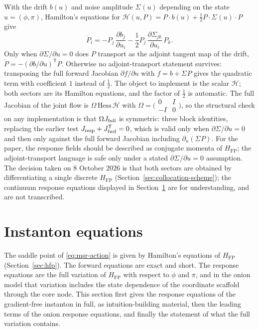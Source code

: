 \documentclass[a4paper,11pt]{article}
\newcommand{\semibold}[1]{{\fontseries{b}\selectfont{#1}}}
\newcommand{\transpose}{\mathsf{T}}
\newenvironment{panel}{\begin{tcolorbox}[enhanced,breakable,colback=gray!10,colframe=gray!30]\small}{\end{tcolorbox}}
\newcommand{\field}{\phi}                    %
\newcommand{\mom}{\pi}                       %
\newcommand{\Sigvol}[1]{\varSigma_{#1}}      %
\newcommand{\Hfp}{H_{\mathrm{FP}}}            %
\begin{document}
\begin{panel}
\semibold{Response fields as conjugate momenta, not as an adjoint
transport.} With the drift $b(u)$ and noise amplitude $\Sigvol{}(u)$
depending on the state $u=(\field,\mom)$, Hamilton's equations for
$\mathcal{H}(u,P)=P\cdot b(u)+\tfrac12P\cdot\Sigvol{}(u)\cdot P$ give
\begin{equation}
    \dot P_i = -P_j\,\frac{\partial b_j}{\partial u_i} - \frac12 P_j\,\frac{\partial\Sigvol{jk}}{\partial u_i}\,P_k .
\end{equation}
Only when $\partial\Sigvol{}/\partial u=0$ does $P$ transport as the
adjoint tangent map of the drift, $\dot P=-(\partial b/\partial u)^{\transpose}P$.
Otherwise no adjoint-transport statement survives: transposing the full
forward Jacobian $\partial f/\partial u$ with $f=b+\Sigvol{}P$ gives the
quadratic term with coefficient $1$ instead of $\tfrac12$. The object to
implement is the scalar $\mathcal{H}$; both sectors are its Hamilton
equations, and the factor of $\tfrac12$ is automatic. The full Jacobian
of the joint flow is $\Omega\,\mathrm{Hess}\,\mathcal{H}$ with
$\Omega=\bigl(\begin{smallmatrix}0&I\\-I&0\end{smallmatrix}\bigr)$, so the
structural check on any implementation is that $\Omega J_{\rm full}$ is
symmetric: three block identities, replacing the earlier test
$J_{\rm resp}+J_{\rm fwd}^{\transpose}=0$, which is valid only when
$\partial\Sigvol{}/\partial u=0$ and then only against the full forward
Jacobian including $\partial_u(\Sigvol{}P)$. For the paper, the response
fields should be described as conjugate momenta of $\Hfp$; the
adjoint-transport language is safe only under a stated
$\partial\Sigvol{}/\partial u=0$ assumption. The decision taken on
8 October 2026 is that both sectors are obtained by differentiating a
single discrete $\Hfp$ (Section~\ref{sec:collocation-scheme}); the
continuum response equations displayed in Section~\ref{sec:instanton-eqs}
are for understanding, and are not transcribed.
\end{panel}
\section{Instanton equations}
\label{sec:instanton-eqs}

The saddle point of \eqref{eq:msr-action} is given by Hamilton's equations
of $\Hfp$ (Section~\ref{sec:hfp}). The forward equations are exact and
short. The response equations are the full variation of $\Hfp$ with
respect to $\field$ and $\mom$, and in the onion model that variation
includes the state dependence of the coordinate scaffold through the core
node. This section first gives the response equations of the gradient-free
instanton in full, as intuition-building material, then the leading terms
of the onion response equations, and finally the statement of what the
full variation contains.
\end{document}
